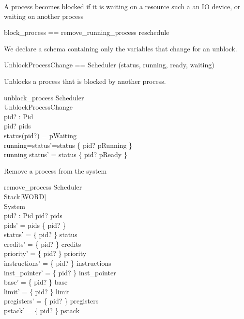\documentclass{article}
\begin{document}
A process becomes blocked if it is waiting on a resource such a an IO
device, or waiting on another process

\begin{zed}
  block\_process == remove\_running\_process \semi reschedule
\end{zed}

We declare a schema containing only the variables that change for an
unblock.

\begin{zed}
  UnblockProcessChange == Scheduler \hide (status, running, ready, waiting)
\end{zed}

Unblocks a process that is blocked by another process.

\begin{schema}{unblock\_process}
  \Delta Scheduler\\
  \Xi UnblockProcessChange\\
  pid? : Pid\\
\where
  pid? \in pids\\
  status(pid?) = pWaiting\\
  running=\emptyset \iff status'=status \oplus \{ pid? \mapsto pRunning \}\\
  running \neq \emptyset \iff status' = status \oplus \{ pid? \mapsto pReady \}
\end{schema}

Remove a process from the system

\begin{schema}{remove\_process}
  \Delta Scheduler\\
  \Xi Stack[WORD]\\
  \Xi System\\
  pid? : Pid
\where
  pid? \in pids\\
  pids' = pids \setminus \{ pid? \}\\
  status' = \{ pid? \} \ndres status\\
  credits' = \{ pid? \} \ndres credits\\
  priority' = \{ pid? \} \ndres priority\\
  instructions' = \{ pid? \} \ndres instructions\\
  inst\_pointer' = \{ pid? \} \ndres inst\_pointer\\
  base'  = \{ pid? \} \ndres base\\
  limit'  = \{ pid? \} \ndres limit\\
  pregisters' = \{ pid? \} \ndres pregisters\\
  pstack' = \{ pid? \} \ndres pstack
\end{schema}
\end{document}
